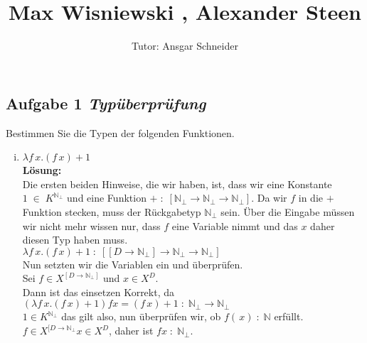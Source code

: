 \documentclass[11pt,a4paper,ngerman]{article}
\author{Tutor: Ansgar Schneider}
\date{}
\title{Max Wisniewski , Alexander Steen}
\begin{document}
   
\maketitle
\thispagestyle{fancy}
\newcommand{\A}{\mathbb{A}}

\subsection*{Aufgabe 1 \mdseries\itshape Typüberprüfung}
Bestimmen Sie die Typen der folgenden Funktionen.
\begin{enumerate}[(i)]
   \item $\lambda f \, x.(f \, x) + 1$\\
      \textbf{Lösung:}\\
         Die ersten beiden Hinweise, die wir haben, ist, dass 
         wir eine Konstante $1 \; \in \; K^{\mathbb{N}_\bot}$ und
         eine Funktion $+ \; : \; [\mathbb{N}_\bot \rightarrow \mathbb{N}_\bot \rightarrow \mathbb{N}_\bot]$.
         Da wir $f$ in die $+$ Funktion stecken, muss der Rückgabetyp $\mathbb{N}_\bot$ sein.
         Über die Eingabe müssen wir nicht mehr wissen nur, dass $f$ eine Variable nimmt und
         das $x$ daher diesen Typ haben muss.\\
         
         $\lambda f \, x. (f \, x) + 1 \; : \; [ [D \rightarrow \mathbb{N}_\bot] 
         \rightarrow \mathbb{N}_\bot \rightarrow \mathbb{N}_\bot  ]$\\

         Nun setzten wir die Variablen ein und überprüfen.\\
         Sei $f \in X^{[D \rightarrow \mathbb{N}_\bot]}$ und $x \in X^{D}$.\\
         Dann ist das einsetzen Korrekt, da
         $(\lambda f \, x. (f \, x) + 1) f x = (f \, x) + 1 \; : \; \mathbb{N}_\bot \rightarrow \mathbb{N}_\bot$\\
         $1 \in K^{\mathbb{N}_\bot}$ das gilt also, nun überprüfen wir, ob
         $f( \, x) \; : \; \mathbb{N}$ erfüllt.\\
         $f \in X^{[D \rightarrow \mathbb{N}_\bot} x \in X^{D}$, daher ist $fx \; : \; \mathbb{N}_\bot$.\\
         

\end{enumerate}
\end{document}
